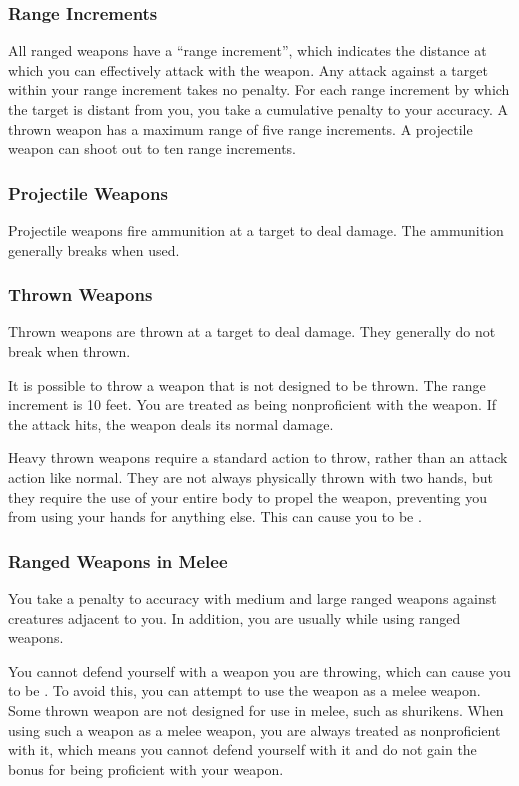         \subsubsection{Range Increments}\label{Range Increment} All ranged weapons have a ``range increment'', which indicates the distance at which you can effectively attack with the weapon. Any attack against a target within your range increment takes no penalty. For each range increment by which the target is distant from you, you take a cumulative  penalty to your accuracy. A thrown weapon has a maximum range of five range increments. A projectile weapon can shoot out to ten range increments.

        \subsubsection{Projectile Weapons} Projectile weapons fire ammunition at a target to deal damage. The ammunition generally breaks when used.

        \subsubsection{Thrown Weapons}\label{Thrown Weapons} Thrown weapons are thrown at a target to deal damage. They generally do not break when thrown.

             It is possible to throw a weapon that is not designed to be thrown. The range increment is 10 feet. You are treated as being nonproficient with the weapon. If the attack hits, the weapon deals its normal damage.

             Heavy thrown weapons require a standard action to throw, rather than an attack action like normal. They are not always physically thrown with two hands, but they require the use of your entire body to propel the weapon, preventing you from using your hands for anything else. This can cause you to be .

        \subsubsection{Ranged Weapons in Melee}

            You take a  penalty to accuracy with medium and large ranged weapons against creatures adjacent to you. In addition, you are usually  while using ranged weapons.

            \label{Thrown Weapons in Melee} You cannot defend yourself with a weapon you are throwing, which can cause you to be . To avoid this, you can attempt to use the weapon as a melee weapon. Some thrown weapon are not designed for use in melee, such as shurikens. When using such a weapon as a melee weapon, you are always treated as nonproficient with it, which means you cannot defend yourself with it and do not gain the  bonus for being proficient with your weapon.

